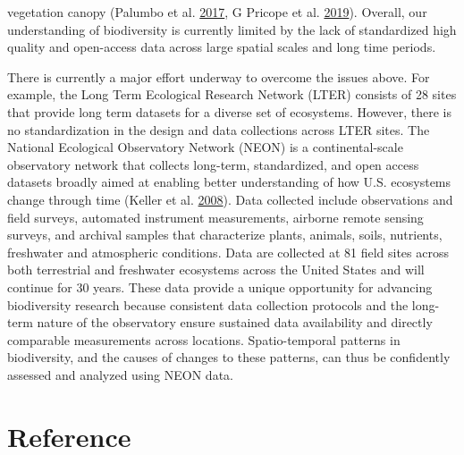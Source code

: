\documentclass[
  12pt,
]{article}
\begin{document}
vegetation canopy (Palumbo et al. \protect\hyperlink{ref-palumbo2017building}{2017}, G Pricope et al. \protect\hyperlink{ref-g2019remote}{2019}). Overall, our understanding of biodiversity is currently limited by the lack of standardized high quality and open-access data across large spatial scales and long time periods.

There is currently a major effort underway to overcome the issues above. For example, the Long Term Ecological Research Network (LTER) consists of 28 sites that provide long term datasets for a diverse set of ecosystems. However, there is no standardization in the design and data collections across LTER sites. The National Ecological Observatory Network (NEON) is a continental-scale observatory network that collects long-term, standardized, and open access datasets broadly aimed at enabling better understanding of how U.S. ecosystems change through time (Keller et al. \protect\hyperlink{ref-keller2008continental}{2008}). Data collected include observations and field surveys, automated instrument measurements, airborne remote sensing surveys, and archival samples that characterize plants, animals, soils, nutrients, freshwater and atmospheric conditions. Data are collected at 81 field sites across both terrestrial and freshwater ecosystems across the United States and will continue for 30 years. These data provide a unique opportunity for advancing biodiversity research because consistent data collection protocols and the long-term nature of the observatory ensure sustained data availability and directly comparable measurements across locations. Spatio-temporal patterns in biodiversity, and the causes of changes to these patterns, can thus be confidently assessed and analyzed using NEON data.

\hypertarget{reference}{%
\section*{Reference}\label{reference}}
\end{document}
